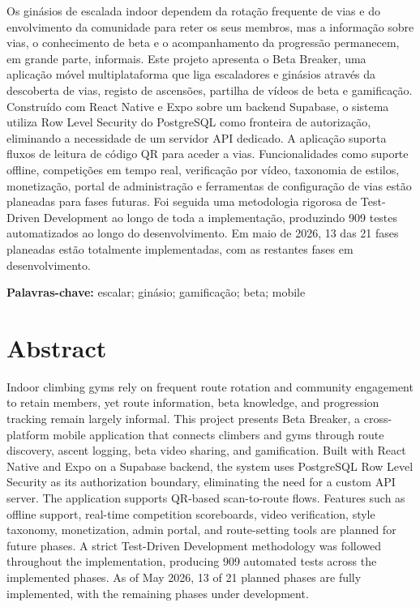 \documentclass[12pt,a4paper]{report}
\renewcommand\_{\textunderscore\hspace{0pt}}
\begin{document}
Os gin\'{a}sios de escalada indoor dependem da rota\c{c}\~{a}o frequente de vias e do envolvimento da comunidade para reter os seus membros, mas a informa\c{c}\~{a}o sobre vias, o conhecimento de beta e o acompanhamento da progress\~{a}o permanecem, em grande parte, informais. Este projeto apresenta o Beta Breaker, uma aplica\c{c}\~{a}o m\'{o}vel multiplataforma que liga escaladores e gin\'{a}sios atrav\'{e}s da descoberta de vias, registo de ascens\~{o}es, partilha de v\'{i}deos de beta e gamifica\c{c}\~{a}o. Constru\'{i}do com React Native e Expo sobre um backend Supabase, o sistema utiliza Row Level Security do PostgreSQL como fronteira de autoriza\c{c}\~{a}o, eliminando a necessidade de um servidor API dedicado. A aplica\c{c}\~{a}o suporta fluxos de leitura de c\'{o}digo QR para aceder a vias. Funcionalidades como suporte offline, competi\c{c}\~{o}es em tempo real, verifica\c{c}\~{a}o por v\'{i}deo, taxonomia de estilos, monetiza\c{c}\~{a}o, portal de administra\c{c}\~{a}o e ferramentas de configura\c{c}\~{a}o de vias est\~{a}o planeadas para fases futuras. Foi seguida uma metodologia rigorosa de Test-Driven Development ao longo de toda a implementa\c{c}\~{a}o, produzindo 909 testes automatizados ao longo do desenvolvimento. Em maio de 2026, 13 das 21 fases planeadas est\~{a}o totalmente implementadas, com as restantes fases em desenvolvimento.

\vspace{1.5cm}
\noindent\textbf{Palavras-chave:} escalar; gin\'{a}sio; gamifica\c{c}\~{a}o; beta; mobile

\clearpage

\section*{Abstract}

Indoor climbing gyms rely on frequent route rotation and community engagement to retain members, yet route information, beta knowledge, and progression tracking remain largely informal. This project presents Beta Breaker, a cross-platform mobile application that connects climbers and gyms through route discovery, ascent logging, beta video sharing, and gamification. Built with React Native and Expo on a Supabase backend, the system uses PostgreSQL Row Level Security as its authorization boundary, eliminating the need for a custom API server. The application supports QR-based scan-to-route flows. Features such as offline support, real-time competition scoreboards, video verification, style taxonomy, monetization, admin portal, and route-setting tools are planned for future phases. A strict Test-Driven Development methodology was followed throughout the implementation, producing 909 automated tests across the implemented phases. As of May 2026, 13 of 21 planned phases are fully implemented, with the remaining phases under development.
\end{document}
